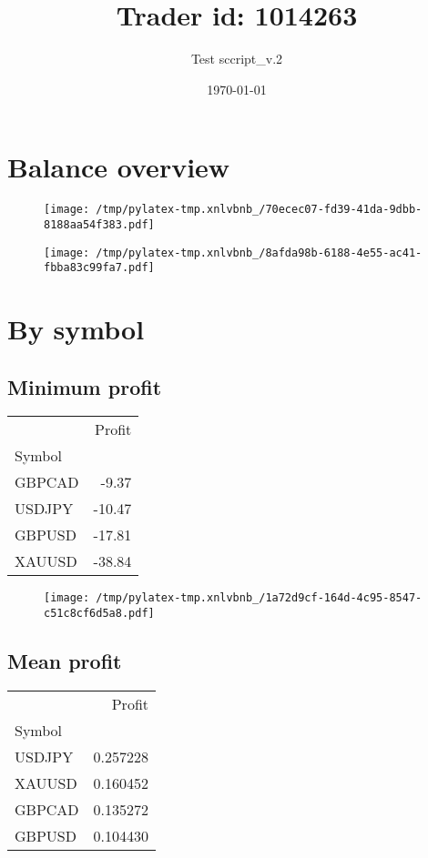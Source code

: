 \documentclass{article}%
\title{Trader id: 1014263}%
\author{Test sccript\_v.2}%
\date{\today}%
\begin{document}
%
\normalsize%
\maketitle%
\section{Balance overview}%
\label{sec:Balanceoverview}%


\begin{figure}[htbp]%
\centering%
\texttt{[image: /tmp/pylatex-tmp.xnlvbnb\_/70ecec07-fd39-41da-9dbb-8188aa54f383.pdf]}%
\end{figure}

%


\begin{figure}[htbp]%
\centering%
\texttt{[image: /tmp/pylatex-tmp.xnlvbnb\_/8afda98b-6188-4e55-ac41-fbba83c99fa7.pdf]}%
\end{figure}

%
\section{By symbol}%
\label{sec:Bysymbol}%
\subsection{Minimum profit }%
\label{subsec:Minimumprofit}%
\begin{tabular}{lr}
\toprule
{} &  Profit \\
Symbol &         \\
\midrule
GBPCAD &   -9.37 \\
USDJPY &  -10.47 \\
GBPUSD &  -17.81 \\
XAUUSD &  -38.84 \\
\bottomrule
\end{tabular}
%


\begin{figure}[htbp]%
\centering%
\texttt{[image: /tmp/pylatex-tmp.xnlvbnb\_/1a72d9cf-164d-4c95-8547-c51c8cf6d5a8.pdf]}%
\end{figure}

%
\newpage %
\subsection{Mean profit }%
\label{subsec:Meanprofit}%
\begin{tabular}{lr}
\toprule
{} &    Profit \\
Symbol &           \\
\midrule
USDJPY &  0.257228 \\
XAUUSD &  0.160452 \\
GBPCAD &  0.135272 \\
GBPUSD &  0.104430 \\
\bottomrule
\end{tabular}
%
\end{document}
